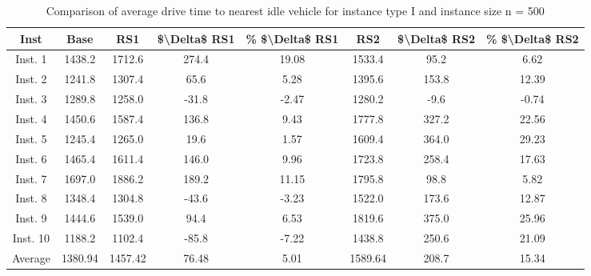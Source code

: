 \begin{table}[H]
\centering
\begin{tabular}{cccccccc}
  \hline
  \textbf{Inst} & \textbf{Base} & \textbf{RS1} & \textbf{\$\textbackslash{}Delta\$  RS1} & \textbf{\% \$\textbackslash{}Delta\$  RS1} & \textbf{RS2} & \textbf{\$\textbackslash{}Delta\$  RS2} & \textbf{\% \$\textbackslash{}Delta\$  RS2} \\\hline
  Inst. 1 & 1438.2 & 1712.6 & 274.4 & 19.08 & 1533.4 & 95.2 & 6.62 \\
  Inst. 2 & 1241.8 & 1307.4 & 65.6 & 5.28 & 1395.6 & 153.8 & 12.39 \\
  Inst. 3 & 1289.8 & 1258.0 & -31.8 & -2.47 & 1280.2 & -9.6 & -0.74 \\
  Inst. 4 & 1450.6 & 1587.4 & 136.8 & 9.43 & 1777.8 & 327.2 & 22.56 \\
  Inst. 5 & 1245.4 & 1265.0 & 19.6 & 1.57 & 1609.4 & 364.0 & 29.23 \\
  Inst. 6 & 1465.4 & 1611.4 & 146.0 & 9.96 & 1723.8 & 258.4 & 17.63 \\
  Inst. 7 & 1697.0 & 1886.2 & 189.2 & 11.15 & 1795.8 & 98.8 & 5.82 \\
  Inst. 8 & 1348.4 & 1304.8 & -43.6 & -3.23 & 1522.0 & 173.6 & 12.87 \\
  Inst. 9 & 1444.6 & 1539.0 & 94.4 & 6.53 & 1819.6 & 375.0 & 25.96 \\
  Inst. 10 & 1188.2 & 1102.4 & -85.8 & -7.22 & 1438.8 & 250.6 & 21.09 \\
  Average & 1380.94 & 1457.42 & 76.48 & 5.01 & 1589.64 & 208.7 & 15.34 \\\hline
\end{tabular}
\caption{Comparison of average drive time to nearest idle vehicle for instance type I and instance size n = 500}
\label{tab:wait:resrelocation-nearest-drive-time-comparison_I_500}
\end{table}
